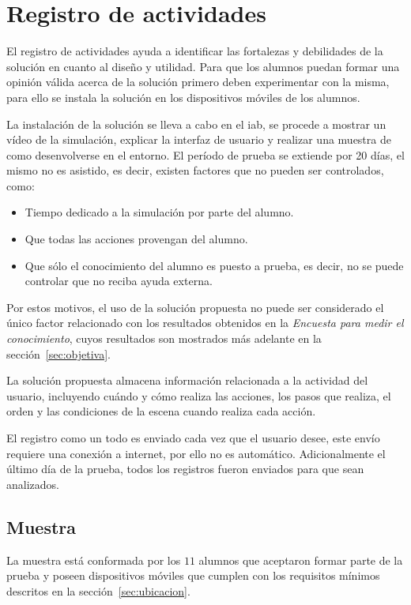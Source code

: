\section{Registro de actividades}
\label{sec:registro}

El registro de actividades ayuda a identificar las  fortalezas y debilidades de
la solución en cuanto al diseño y utilidad. Para que los alumnos puedan formar
una opinión válida acerca de la solución primero deben experimentar con la
misma, para ello se instala la solución en los dispositivos móviles de los
alumnos.

La instalación de la solución se lleva a cabo en el \Gls{iab}, se procede a
mostrar un vídeo de la simulación, explicar la interfaz de usuario y realizar
una muestra de como desenvolverse en el entorno. El período de prueba se
extiende por 20 días, el mismo no es asistido, es decir, existen factores que no
pueden ser controlados, como:

\begin{itemize}
    \item Tiempo dedicado a la simulación por parte del alumno.
    \item Que todas las acciones provengan del alumno.
    \item Que sólo el conocimiento del alumno es puesto a prueba, es decir, no
        se puede controlar que no reciba ayuda externa.
\end{itemize}

Por estos motivos, el uso de la solución propuesta no puede ser considerado el
único factor relacionado con los resultados obtenidos en la \emph{Encuesta para
    medir el conocimiento}, cuyos resultados son mostrados más adelante en la
sección~\ref{sec:objetiva}.

La solución propuesta almacena información relacionada a la actividad del
usuario, incluyendo cuándo y cómo realiza las acciones, los pasos que realiza,
el orden y las condiciones de la escena cuando realiza cada acción.

El registro como un todo es enviado cada vez que el usuario desee, este envío
requiere una conexión a internet, por ello no es automático. Adicionalmente el
último día de la prueba, todos los registros fueron enviados para que sean
analizados.

\subsection{Muestra}

La muestra está conformada por los $11$ alumnos que aceptaron formar parte de 
la prueba y poseen dispositivos móviles que cumplen con los requisitos
mínimos descritos en la sección~\ref{sec:ubicacion}.


